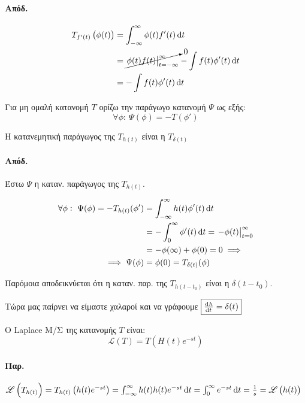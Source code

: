 \documentclass[11pt,a4paper,titlepage,final]{article}
\begin{document}
\paragraph{Απόδ.}
\begin{align*}
T_{f'(t)}\left(\phi(t) \right) &= \int_{-\infty}^\infty\phi(t)f'(t)\dif t \\
&= \cancelto{0}{\left. \phi(t) f(t) \right|_{t=-\infty}^\infty} - \int f(t)\phi'(t) \dif t \\
&=- \int f(t)\phi'(t) \dif t
\end{align*}

\begin{defn}{}{}
Για μη ομαλή κατανομή \( T \) ορίζω την παράγωγο κατανομή \( \Psi \) ως εξής:
\[
\forall \phi: \ \Psi(\phi) = -T(\phi')
\]
\end{defn}

\begin{theorem}{}{}
Η κατανεμητική παράγωγος της \( T_{h(t)} \) είναι η \( T_{\delta(t)} \)
\end{theorem}
\paragraph{Απόδ.}
Έστω \( \Psi \) η καταν. παράγωγος της \( T_{h(t)} \).

\begin{align*}
\forall \phi:\ \Psi(\phi) = - T_{h(t)}(\phi') &=
\int_{-\infty}^\infty h(t) \phi'(t) \dif t
\\ &= - \int_0^\infty \phi'(t)\dif t = \left. -\phi(t) \right|_{t=0}^\infty
\\ &= -\phi(\infty) + \phi(0) = 0 \implies \\
\implies \Psi(\phi) &= \phi(0) = T_{\delta(t)}(\phi)
 \end{align*}
 
 Παρόμοια αποδεικνύεται ότι η καταν. παρ. της \( T_{h(t-t_0)} \) είναι η \( \delta(t-t_0) \).
 
 Τώρα μας παίρνει να είμαστε χαλαροί και να γράφουμε \(\boxed{ \od{h}{t} = \delta(t) }\)
 
\begin{defn}{}{}
Ο \textlatin{Laplace} Μ/Σ της κατανομής \( T \) είναι:
\[
\mathscr L (T) = T \left(H(t) e^{-st} \right)
\]
\end{defn}
\paragraph{Παρ.}
\( 
\mathscr L\left(T_{h(t)} \right) = T_{h(t)} \left(h(t)e^{-st} \right) = \int^\infty_{-\infty} h(t)h(t)e^{-st}\dif t = \int_0^\infty e^{-st} \dif t = \frac{1}{s} = \mathscr L\left(h(t)\right)
 \)
 
\end{document}

